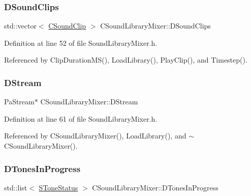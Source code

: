 \subsubsection{\texorpdfstring{D\+Sound\+Clips}{DSoundClips}}
{\footnotesize\ttfamily std\+::vector$<$ \hyperlink{classCSoundClip}{C\+Sound\+Clip} $>$ C\+Sound\+Library\+Mixer\+::\+D\+Sound\+Clips\hspace{0.3cm}{\ttfamily [protected]}}



Definition at line 52 of file Sound\+Library\+Mixer.\+h.



Referenced by Clip\+Duration\+M\+S(), Load\+Library(), Play\+Clip(), and Timestep().

\hypertarget{classCSoundLibraryMixer_ad992cd6202130db3a45ca695eca34625}{}\label{classCSoundLibraryMixer_ad992cd6202130db3a45ca695eca34625} 
\subsubsection{\texorpdfstring{D\+Stream}{DStream}}
{\footnotesize\ttfamily Pa\+Stream$\ast$ C\+Sound\+Library\+Mixer\+::\+D\+Stream\hspace{0.3cm}{\ttfamily [protected]}}



Definition at line 61 of file Sound\+Library\+Mixer.\+h.



Referenced by C\+Sound\+Library\+Mixer(), Load\+Library(), and $\sim$\+C\+Sound\+Library\+Mixer().

\hypertarget{classCSoundLibraryMixer_a39bb9c811d842a282b6b7058ac7dfe1c}{}\label{classCSoundLibraryMixer_a39bb9c811d842a282b6b7058ac7dfe1c} 
\subsubsection{\texorpdfstring{D\+Tones\+In\+Progress}{DTonesInProgress}}
{\footnotesize\ttfamily std\+::list$<$ \hyperlink{structCSoundLibraryMixer_1_1SToneStatus}{S\+Tone\+Status} $>$ C\+Sound\+Library\+Mixer\+::\+D\+Tones\+In\+Progress\hspace{0.3cm}{\ttfamily [protected]}}



